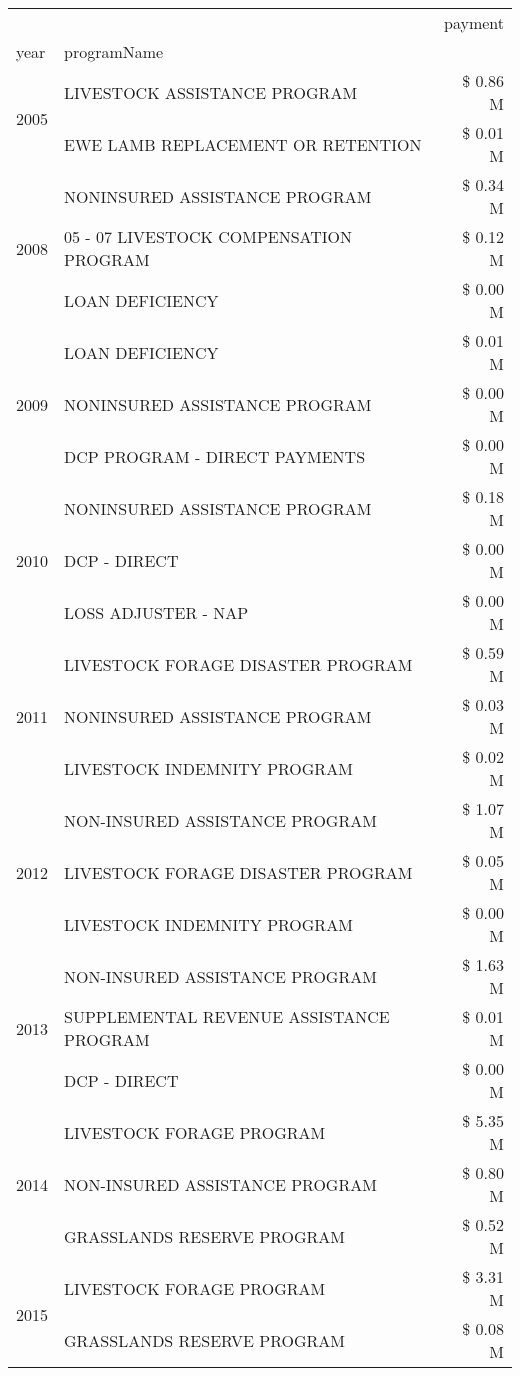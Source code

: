 \begin{tabular}{llr}
\toprule
 &  & payment \\
year & programName &  \\
\midrule
\multirow[t]{2}{*}{2005} & LIVESTOCK ASSISTANCE PROGRAM & \$ 0.86 M \\
 & EWE LAMB REPLACEMENT OR RETENTION & \$ 0.01 M \\
\cline{1-3}
\multirow[t]{3}{*}{2008} & NONINSURED ASSISTANCE PROGRAM & \$ 0.34 M \\
 & 05 - 07 LIVESTOCK COMPENSATION PROGRAM & \$ 0.12 M \\
 & LOAN DEFICIENCY & \$ 0.00 M \\
\cline{1-3}
\multirow[t]{3}{*}{2009} & LOAN DEFICIENCY & \$ 0.01 M \\
 & NONINSURED ASSISTANCE PROGRAM & \$ 0.00 M \\
 & DCP PROGRAM - DIRECT PAYMENTS & \$ 0.00 M \\
\cline{1-3}
\multirow[t]{3}{*}{2010} & NONINSURED ASSISTANCE PROGRAM & \$ 0.18 M \\
 & DCP - DIRECT & \$ 0.00 M \\
 & LOSS ADJUSTER - NAP & \$ 0.00 M \\
\cline{1-3}
\multirow[t]{3}{*}{2011} & LIVESTOCK FORAGE DISASTER PROGRAM & \$ 0.59 M \\
 & NONINSURED ASSISTANCE PROGRAM & \$ 0.03 M \\
 & LIVESTOCK INDEMNITY PROGRAM & \$ 0.02 M \\
\cline{1-3}
\multirow[t]{3}{*}{2012} & NON-INSURED ASSISTANCE PROGRAM & \$ 1.07 M \\
 & LIVESTOCK FORAGE DISASTER PROGRAM & \$ 0.05 M \\
 & LIVESTOCK INDEMNITY PROGRAM & \$ 0.00 M \\
\cline{1-3}
\multirow[t]{3}{*}{2013} & NON-INSURED ASSISTANCE PROGRAM & \$ 1.63 M \\
 & SUPPLEMENTAL REVENUE ASSISTANCE PROGRAM & \$ 0.01 M \\
 & DCP - DIRECT & \$ 0.00 M \\
\cline{1-3}
\multirow[t]{3}{*}{2014} & LIVESTOCK FORAGE PROGRAM & \$ 5.35 M \\
 & NON-INSURED ASSISTANCE PROGRAM & \$ 0.80 M \\
 & GRASSLANDS RESERVE PROGRAM & \$ 0.52 M \\
\cline{1-3}
\multirow[t]{3}{*}{2015} & LIVESTOCK FORAGE PROGRAM & \$ 3.31 M \\
 & GRASSLANDS RESERVE PROGRAM & \$ 0.08 M \\

\end{tabular}
